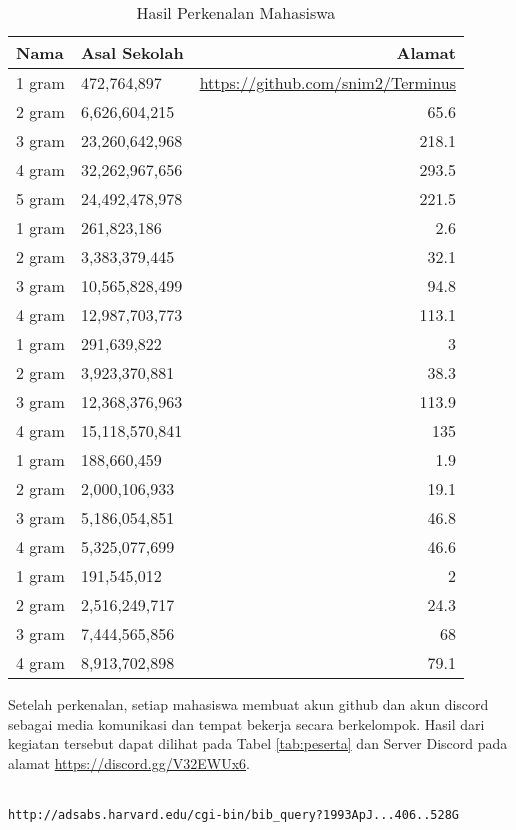 \documentclass[a4paper]{tufte-handout}
\begin{document}
\begin{table}[!ht]
\caption{Hasil Perkenalan Mahasiswa}
\label{tab:perkenalan}
\centering
\begin{tabular}{llr} 
\toprule
Nama 	&	Asal Sekolah 	&	Alamat\\
\midrule
1 gram &	472,764,897 	&	\url{https://github.com/snim2/Terminus} \\
2 gram &	6,626,604,215 	&	65.6\\
3 gram &	23,260,642,968 	&	218.1\\
4 gram &	32,262,967,656 	&	293.5\\
5 gram &	24,492,478,978 	&	221.5\\
\midrule
1 gram &	261,823,186 	&	2.6\\
2 gram &	3,383,379,445 	&	32.1\\
3 gram &	10,565,828,499 	&	94.8\\
4 gram &	12,987,703,773 	&	113.1\\
\midrule
1 gram &	291,639,822 	&	3\\
2 gram &	3,923,370,881 	&	38.3\\
3 gram &	12,368,376,963 	&	113.9\\
4 gram &	15,118,570,841 	&	135\\
\midrule
1 gram &	188,660,459 	&	1.9\\
2 gram &	2,000,106,933 	&	19.1\\
3 gram &	5,186,054,851 	&	46.8\\
4 gram &	5,325,077,699 	&	46.6\\
\midrule
1 gram	&	191,545,012		&	2\\
2 gram	&	2,516,249,717	&	24.3\\
3 gram	&	7,444,565,856	&	68\\
4 gram	&	8,913,702,898	&	79.1\\
\midrule
\end{tabular}
\end{table}

Setelah perkenalan, setiap mahasiswa membuat akun github dan akun discord sebagai media komunikasi dan tempat bekerja secara berkelompok. Hasil dari kegiatan tersebut dapat dilihat pada Tabel \ref{tab:peserta} dan Server Discord pada alamat \url{https://discord.gg/V32EWUx6}.

\hrulefill

\newpage
{}

 \\
{\tt http://adsabs.harvard.edu/cgi-bin/bib\_query?1993ApJ...406..528G}
\end{document}
